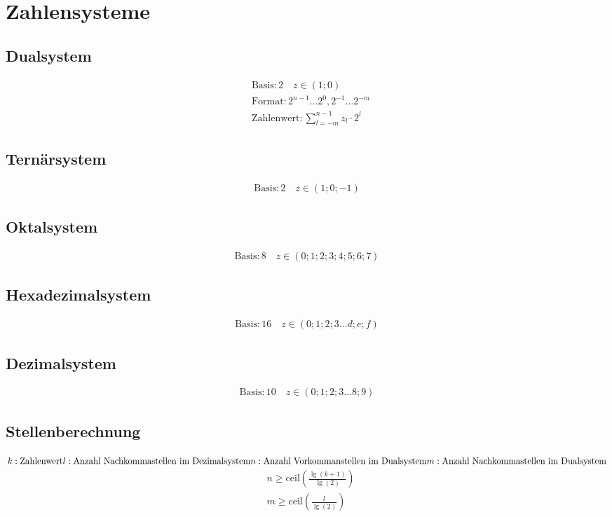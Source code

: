 \section{Zahlensysteme}
\begin{multicols}{2}
	\subsection{Dualsystem}
	\begin{align*}
	&\text{Basis}:2\quad z\in\left(1;0\right)\\
	&\text{Format}:2^{n-1} \dots 2^{0},2^{-1} \dots 2^{-m}\\
	&\text{Zahlenwert}:\sum_{l=-m}^{n-1}z_l\cdot2^l
	\end{align*}
	
	\subsection{Ternärsystem}
	\begin{align*}
	\text{Basis}:2\quad z\in\left(1;0;-1\right)
	\end{align*}
	
	\subsection{Oktalsystem}
	\begin{align*}
	\text{Basis}:8\quad z\in\left(0;1;2;3;4;5;6;7\right)
	\end{align*}
	
	\subsection{Hexadezimalsystem}
	\begin{align*}
	\text{Basis}:16\quad z\in\left(0;1;2;3\dots d;e;f\right)
	\end{align*}
	
	\subsection{Dezimalsystem}
	\begin{align*}
	\text{Basis}:10\quad z\in\left(0;1;2;3\dots 8;9\right)
	\end{align*}
\end{multicols}

\newpage
\subsection{Stellenberechnung}
\(
k: \text{Zahlenwert}\\
l: \text{Anzahl Nachkommastellen im Dezimalsystem}\\
n: \text{Anzahl Vorkommanstellen im Dualsystem}\\
m: \text{Anzahl Nachkommastellen im Dualsystem}
\)
\begin{align*}
&n\geq\text{ceil}\left(\frac{\lg\left(k+1\right)}{\lg\left(2\right)}\right)\\
&m\geq\text{ceil}\left(\frac{l}{\lg\left( 2\right)}\right)
\end{align*}

